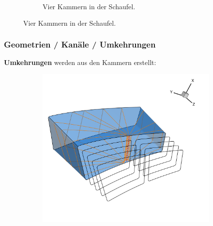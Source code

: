 \documentclass[8pt, aspectratio=169]{beamer}
\begin{document}
\begin{frame}
\begin{minipage}[t]{\textwidth}
\begin{figure}[H]
\begin{subfigure}{.36\textwidth}
				\caption{Vier Kammern in der Schaufel.}
			\end{subfigure}
		\end{figure}
	\end{minipage}
	\vfill
\end{frame}

\begin{frame}
	\frametitle{Geometrien / Kanäle / Umkehrungen}
	\vspace{-0.25cm}\hspace{-0.5cm}
	\centering
	\begin{minipage}[t]{\textwidth}
		\textbf{Umkehrungen} werden aus den Kammern erstellt:
		\begin{figure}[H]
			\centering
			\begin{subfigure}{.55\textwidth}
				\includegraphics[width=\textwidth]{../../tec/channel/11.png}
			\end{subfigure}
			\begin{subfigure}{.32\textwidth}

\end{subfigure}
\end{figure}
\end{minipage}
\end{frame}
\end{document}
